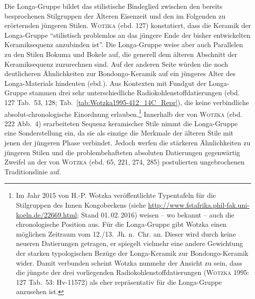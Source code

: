 Die Longa-Gruppe bildet das stilistische Bindeglied zwischen den bereits besprochenen Stilgruppen der Älteren Eisenzeit und den im Folgenden zu erörternden jüngeren Stilen. \textsc{Wotzka} (ebd. 127) konstatiert, dass die Keramik der Longa-Gruppe \enquote{stilistisch problemlos an das jüngere Ende der bisher entwickelten Keramiksequenz anzubinden ist}. Die Longa-Gruppe weise aber auch Parallelen zu den Stilen Bokuma und Bokele auf, die generell dem älteren Abschnitt der Keramiksequenz zuzurechnen sind. Auf der anderen Seite würden die noch deutlicheren Ähnlichkeiten zur Bondongo-Keramik auf ein jüngeres Alter des Longa-Materials hindeuten (ebd.). Aus Kontexten mit Fundgut der Longa-Gruppe stammen drei sehr unterschiedliche Radiokohlenstoffdatierungen (ebd. 127 Tab.~53, 128; Tab.~\ref{tab:Wotzka1995-412_14C_Repr}), die keine verbindliche absolut-chronologische Einordnung erlauben.\footnote{Im Jahr 2015 von H.-P. Wotzka veröffentlichte Typentafeln für die Stilgruppen des Innen Kongobeckens (siehe \url{http://www.fstafrika.phil-fak.uni-koeln.de/22669.html}; Stand 01.\,02.\,2016) weisen -- wo bekannt -- auch die chronologische Position aus. Für die Longa-Gruppe gibt Wotzka einen möglichen Zeitraum vom 12./13.~Jh. n.~Chr. an. Dieser wird durch keine neueren Datierungen getragen, er spiegelt vielmehr eine andere Gewichtung der starken typologischen Bezüge der Longa-Keramik zur Bondongo-Keramik wider. Damit verbunden scheint Wotzka nunmehr der Ansicht zu sein, dass die jüngste der drei vorliegenden Radiokohlenstoffdatierungen (\textsc{Wotzka} 1995: 127 Tab.~53: Hv-11572) als eher repräsentativ für die Longa-Gruppe anzusehen ist.\label{ftn:fstafrikaWebStilGr-Tafeln}} Innerhalb der von \textsc{Wotzka} (ebd. 222 Abb.~4) erarbeiteten Sequenz keramischer Stile nimmt die Longa-Gruppe eine Sonderstellung ein, da sie als einzige die Merkmale der älteren Stile mit jenen der jüngeren Phase verbindet. Jedoch werfen die stärkeren Ähnlichkeiten zu jüngeren Stilen und die problembehafteten absoluten Datierungen gegenwärtig Zweifel an der von \textsc{Wotzka} (ebd. 65, 221, 274, 285) postulierten ungebrochenen Traditionslinie auf.

